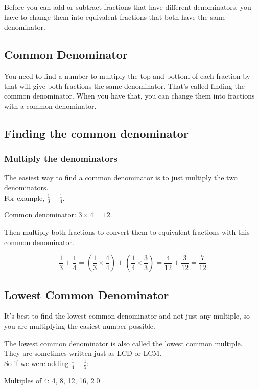 \documentclass[14pt]{article}
\begin{document}
\begin{enumerate}
Before you can add or subtract fractions that have different denominators, you have to change them into equivalent fractions that both have the same denominator.

\subsection*{Common Denominator}
You need to find a number to multiply the top and bottom of each fraction by that will give both fractions the same denominator. That's called finding the common denominator. When you have that, you can change them into fractions with a common denominator.


\subsection*{Finding the common denominator}

\subsubsection*{Multiply the denominators}
The easiest way to find a common denominator is to just multiply the two denominators.\\

For example, $\frac{1}{3} + \frac{1}{4}$.

Common denominator: $3 \times 4 = 12$.

Then multiply both fractions to convert them to equivalent fractions with this common denominator.

$$\frac{1}{3} + \frac{1}{4} = (\frac{1}{3} \times \frac{4}{4}) + (\frac{1}{4} \times \frac{3}{3}) = \frac{4}{12}+\frac{3}{12} = \frac{7}{12}$$

\subsection*{Lowest Common Denominator}
It's best to find the lowest common denominator and not just any multiple, so you are multiplying the easiest number possible.

The lowest common denominator is also called the lowest common multiple.\\

They are sometimes written just as LCD or LCM.\\

So if we were adding $\frac{1}{4} + \frac{1}{5}$:

Multiples of 4: 4, 8, 12, 16, \textcircled{20}


\end{enumerate}
\end{document}
